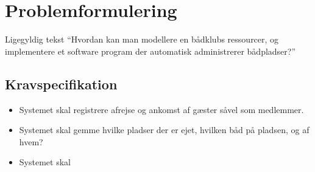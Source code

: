 \chapter{Problemformulering}
\label{cha:problemformulering}

Ligegyldig tekst
\enquote{Hvordan kan man modellere en bådklubs ressourcer, og implementere et software program der automatisk administrerer bådpladser?}


\section{Kravspecifikation} %
\label{sec:Kravspecifikation}

\begin{itemize}
  \item Systemet skal registrere afrejse og ankomst af gæster såvel som medlemmer.
  \item Systemet skal gemme hvilke pladser der er ejet, hvilken båd på pladsen, og af hvem?
  \item Systemet skal 
\end{itemize}



